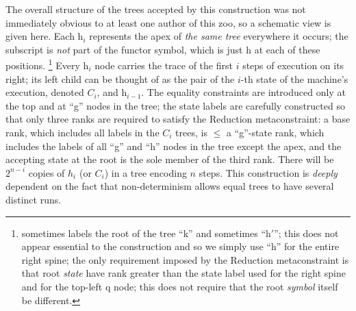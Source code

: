 The overall structure of the trees accepted by this construction was not
immediately obvious to at least one author of this zoo, so a schematic view
is given here.  Each h$_i$ represents the apex of {\em the same tree}
everywhere it occurs; the subscript is {\em not} part of the functor symbol,
which is just h at each of these positions.%
%
\footnote{\cite{tata} sometimes labels the root of the tree ``k'' and
sometimes ``h$'$''; this does not appear essential to the construction and
so we simply use ``h'' for the entire right spine; the only requirement
imposed by the Reduction metaconstraint is that root {\em state} have rank
greater than the state label used for the right spine and for the top-left q
node; this does not require that the root {\em symbol} itself be different.}
%
Every h$_i$ node carries the trace of the first $i$ steps of execution on
its right; its left child can be thought of as the pair of the $i$-th state
of the machine's execution, denoted $C_i$, and h$_{i-1}$.  The equality
constraints are introduced only at the top and at ``g'' nodes in the tree;
the state labels are carefully constructed so that only three ranks are
required to satisfy the Reduction metaconstraint: a base rank, which
includes all labels in the $C_i$ trees, is $\le$ a ``g''-state rank, which
includes the labels of all ``g'' and ``h'' nodes in the tree except the
apex, and the accepting state at the root is the sole member of the third
rank.  There will be $2^{n-i}$ copies of $h_i$ (or $C_i$) in a tree encoding
$n$ steps.  This construction is {\em deeply} dependent on the fact that
non-determinism allows equal trees to have several distinct runs. 
